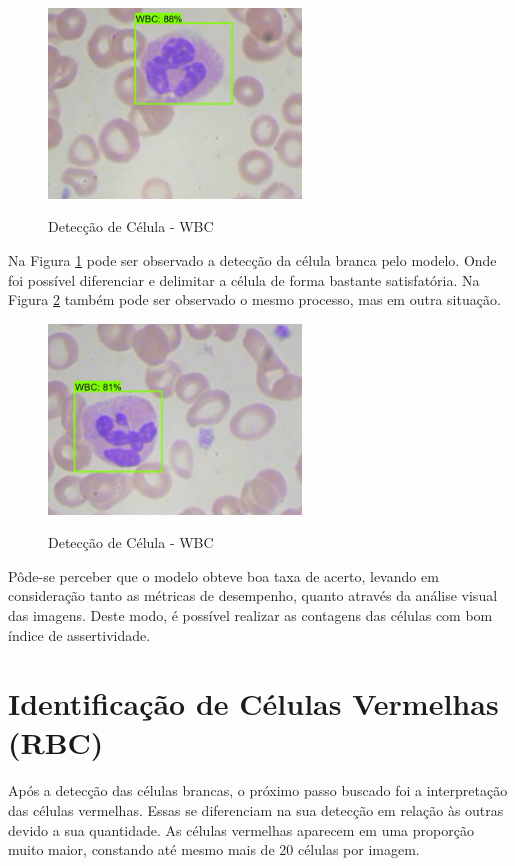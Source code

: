 \begin{figure}[!htb]
	\centering
	\caption{Detecção de Célula - WBC}
	\includegraphics[width=0.60\textwidth]{img/predict_wbc.jpeg}
	\label{fig:predict_wbc}
\end{figure}

Na Figura \ref{fig:predict_wbc} pode ser observado a detecção da célula branca pelo modelo. Onde foi possível diferenciar e delimitar a célula de forma bastante satisfatória. Na Figura \ref{fig:predict_wbc_2} também pode ser observado o mesmo processo, mas em outra situação.

\begin{figure}[!htb]
	\centering
	\caption{Detecção de Célula - WBC}
	\includegraphics[width=0.60\textwidth]{img/predict_wbc_2.jpeg}
	\label{fig:predict_wbc_2}
\end{figure}

Pôde-se perceber que o modelo obteve boa taxa de acerto, levando em consideração tanto as métricas de desempenho, quanto através da análise visual das imagens. Deste modo, é possível realizar as contagens das células com bom índice de assertividade.

\section{Identificação de Células Vermelhas (RBC)}
Após a detecção das células brancas, o próximo passo buscado foi a interpretação das células vermelhas. Essas se diferenciam na sua detecção em relação às outras devido a sua quantidade. As células vermelhas aparecem em uma proporção muito maior, constando até mesmo mais de 20 células por imagem.

